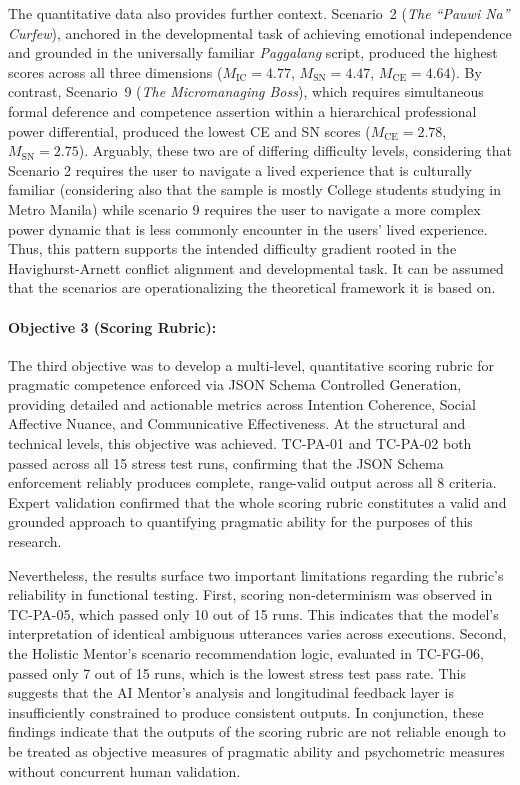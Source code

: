 The quantitative data also provides further context. Scenario~2 (\textit{The ``Pauwi Na'' Curfew}), 
anchored in the developmental task of achieving emotional independence and 
grounded in the universally familiar \textit{Paggalang} script, produced the 
highest scores across all three dimensions ($M_{\text{IC}} = 4.77$, 
$M_{\text{SN}} = 4.47$, $M_{\text{CE}} = 4.64$). By contrast, Scenario~9 
(\textit{The Micromanaging Boss}), which requires simultaneous formal deference 
and competence assertion within a hierarchical professional power differential, 
produced the lowest CE and SN scores ($M_{\text{CE}} = 2.78$, 
$M_{\text{SN}} = 2.75$). Arguably, these two are of differing difficulty levels, considering that 
Scenario 2 requires the user to navigate a lived experience that is culturally familiar (considering also that the sample is mostly
College students studying in Metro Manila) while scenario 9 requires the user to navigate a more complex power dynamic that is less commonly encounter in the
users' lived experience. Thus, this pattern supports the intended difficulty gradient rooted in the Havighurst-Arnett conflict alignment and developmental task. 
It can be assumed that the scenarios are operationalizing the theoretical framework it is based on.

\paragraph{Objective 3 (Scoring Rubric):} 

The third objective was to develop a multi-level, quantitative scoring rubric 
for pragmatic competence enforced via JSON Schema Controlled Generation, 
providing detailed and actionable metrics across Intention Coherence, Social 
Affective Nuance, and Communicative Effectiveness. At the structural and 
technical levels, this objective was achieved. TC-PA-01 and TC-PA-02 both 
passed across all 15 stress test runs, confirming that the JSON Schema 
enforcement reliably produces complete, range-valid output across all 8 
criteria. Expert validation confirmed that the whole scoring rubric 
constitutes a valid and grounded approach to quantifying pragmatic 
ability for the purposes of this research.

Nevertheless, the results surface two important limitations regarding the 
rubric's reliability in functional testing. First, scoring non-determinism was observed 
in TC-PA-05, which passed only 10 out of 15 runs. This indicates that the model's 
interpretation of identical ambiguous utterances varies across executions. 
Second, the Holistic Mentor's scenario recommendation logic, evaluated in 
TC-FG-06, passed only 7 out of 15 runs, which is the lowest stress test pass rate. 
This suggests that the AI Mentor's analysis and longitudinal feedback layer is insufficiently constrained to produce consistent outputs.
In conjunction, these findings indicate that the outputs of the scoring rubric are not reliable enough to be treated as
objective measures of pragmatic ability and psychometric measures without concurrent human validation. 


